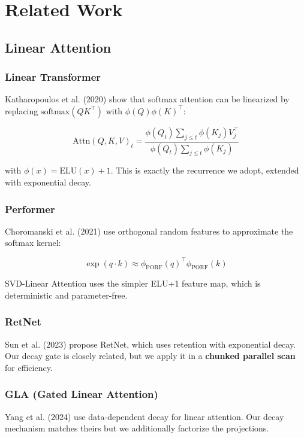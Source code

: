 
\section{Related Work}

\subsection{Linear Attention}

\subsubsection{Linear Transformer}

Katharopoulos et al. (2020) show that softmax attention can be linearized 
by replacing $\text{softmax}(Q K^\top)$ with $\phi(Q) \phi(K)^\top$:

\[
\text{Attn}(Q, K, V)_t = \frac{\phi(Q_t) \sum_{j \leq t} \phi(K_j) V_j^\top}{\phi(Q_t) \sum_{j \leq t} \phi(K_j)}
\tag{2.1}
\]

with $\phi(x) = \text{ELU}(x) + 1$. This is exactly the recurrence we adopt, 
extended with exponential decay.

\subsubsection{Performer}

Choromanski et al. (2021) use orthogonal random features to approximate 
the softmax kernel:

\[
\exp(q \cdot k) \approx \phi_{\text{PORF}}(q)^\top \phi_{\text{PORF}}(k)
\tag{2.2}
\]

SVD-Linear Attention uses the simpler ELU+1 feature map, which is 
deterministic and parameter-free.

\subsubsection{RetNet}

Sun et al. (2023) propose RetNet, which uses retention with exponential 
decay. Our decay gate is closely related, but we apply it in a 
\textbf{chunked parallel scan} for efficiency.

\subsubsection{GLA (Gated Linear Attention)}

Yang et al. (2024) use data-dependent decay for linear attention. Our 
decay mechanism matches theirs but we additionally factorize the projections.

